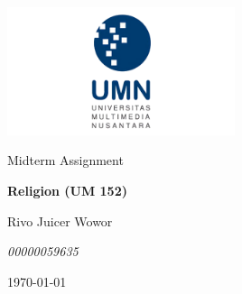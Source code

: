 \documentclass[
  11pt,
  answers  
]{exam}
\newcommand{\mytitle}{Religion (UM 152)}
\newcommand{\theauthor}{Rivo Juicer Wowor}
\newcommand{\affiliation}{00000059635}
\begin{document}
	\begin{titlepage}
		\centering
		\vspace{2cm}
		\includegraphics[width=0.5\textwidth]{../../ref/logoUMN.png}\par\vspace{1cm}
		\vspace{1.5cm}
		\Large{Midterm Assignment} \par
		\vspace{1cm}
		\huge{\textbf{\mytitle}} \par
		\vspace{1.5cm}
		\Large{\theauthor} \par
		\emph{\affiliation} \par
		\vfill
		\today
		\end{titlepage}	
\end{document}
